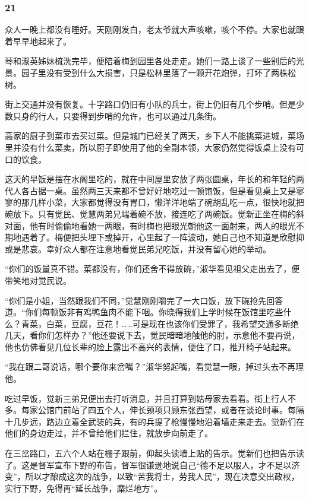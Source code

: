 \subsubsection*{21}

\par 众人一晚上都没有睡好。天刚刚发白，老太爷就大声咳嗽，咳个不停。大家也就跟着早早地起来了。
\par 琴和淑英姊妹梳洗完毕，便陪着梅到园里各处走走。她们一路上谈了一些别后的光景。园子里没有受到什么大损害，只是松林里落了一颗开花炮弹，打坏了两株松树。
\par 街上交通并没有恢复。十字路口仍旧有小队的兵士，街上仍旧有几个步哨。但是少数只身的行人，只要得到步哨的允许，也可以通过几条街。
\par 高家的厨子到菜市去买过菜。但是城门已经关了两天，乡下人不能挑菜进城，菜场里并没有什么菜卖，所以厨子即使用了他的全副本领，大家仍然觉得饭桌上没有可口的饮食。
\par 这天的早饭是摆在水阁里吃的，就在中间屋里安放了两张圆桌，年长的和年轻的两代人各占据一桌。虽然两三天来都不曾好好地吃过一顿饱饭，但是看见桌上又是寥寥的那几样小菜，大家都觉得没有胃口，懒洋洋地端了碗胡乱吃一点，很快地就把碗放下。只有觉民、觉慧两弟兄端着碗不放，接连吃了两碗饭。觉新正坐在梅的斜对面，他有时偷偷地看她一两眼，有时梅也把眼光朝他这一面射来，两人的眼光不期地遇着了。梅便把头埋下或掉开，心里起了一阵波动，她自己也不知道是欣慰抑或是悲哀。幸好众人都在注意地看觉民弟兄吃饭，并没有留心她的举动。
\par “你们的饭量真不错。菜都没有，你们还舍不得放碗，”淑华看见祖父走出去了，便带笑地对觉民说。
\par “你们是小姐，当然跟我们不同，”觉慧刚刚嚼完了一大口饭，放下碗抢先回答道。“你们每顿饭非有鸡鸭鱼肉不能下咽。你晓得我们上学时候在饭馆里吃些什么？青菜，白菜，豆腐，豆花！……可是现在也该你们受罪了，我希望交通多断绝几天，看你们怎样办？”他还要说下去，觉民暗暗地触他的肘，示意他不要再说，他也仿佛看见几位长辈的脸上露出不高兴的表情，便住了口，推开椅子站起来。
\par “我在跟二哥说话，哪个要你来岔嘴？”淑华努起嘴，看觉慧一眼，掉过头去不再理他。
\par 吃过早饭，觉新三弟兄便出去打听消息，并且打算到姑母家去看看。街上行人不多。每家公馆门前站了四五个人，伸长颈项只顾东张西望，或者在谈论时事。每隔十几步远，路边立着全武装的兵，有的兵提了枪慢慢地沿着墙走来走去。觉新们在他们的身边走过，并不曾给他们拦住，就放步向前走了。
\par 在三岔路口，五六个人站在栅子跟前，仰起头读墙上贴的告示。觉新们也把告示读了。这是督军宣布下野的布告，督军很谦逊地说自己“德不足以服人，才不足以济变”，所以才酿成这次的战争，以致“苦我将士，劳我人民”，现在决意交出政权，实行下野，免得再“延长战争，糜烂地方”。
